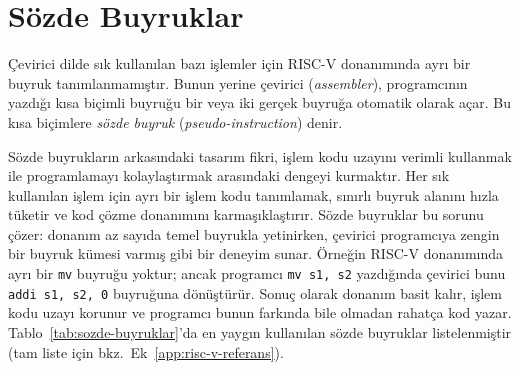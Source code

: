 \section{Sözde Buyruklar}
\label{sec:sozde-buyruklar}

Çevirici dilde sık kullanılan bazı işlemler için RISC-V donanımında ayrı bir buyruk tanımlanmamıştır. Bunun yerine çevirici (\textit{assembler}), programcının yazdığı kısa biçimli buyruğu bir veya iki gerçek buyruğa otomatik olarak açar. Bu kısa biçimlere \emph{sözde buyruk} (\textit{pseudo-instruction}) denir.

Sözde buyrukların arkasındaki tasarım fikri, işlem kodu uzayını verimli kullanmak ile programlamayı kolaylaştırmak arasındaki dengeyi kurmaktır. Her sık kullanılan işlem için ayrı bir işlem kodu tanımlamak, sınırlı buyruk alanını hızla tüketir ve kod çözme donanımını karmaşıklaştırır. Sözde buyruklar bu sorunu çözer: donanım az sayıda temel buyrukla yetinirken, çevirici programcıya zengin bir buyruk kümesi varmış gibi bir deneyim sunar. Örneğin RISC-V donanımında ayrı bir \texttt{mv} buyruğu yoktur; ancak programcı \texttt{mv s1, s2} yazdığında çevirici bunu \texttt{addi s1, s2, 0} buyruğuna dönüştürür. Sonuç olarak donanım basit kalır, işlem kodu uzayı korunur ve programcı bunun farkında bile olmadan rahatça kod yazar. Tablo~\ref{tab:sozde-buyruklar}'da en yaygın kullanılan sözde buyruklar listelenmiştir (tam liste için bkz.\ Ek~\ref{app:risc-v-referans}).

